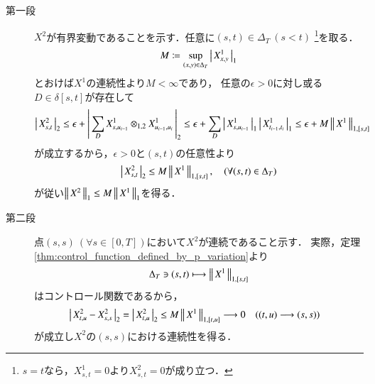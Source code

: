 	\begin{prf}\mbox{}
		\begin{description}
			\item[第一段]
				$X^2$が有界変動であることを示す．任意に$(s,t) \in \Delta_T\ (s < t)$
				\footnote{
					$s=t$なら，$X^1_{s,t} = 0$より$X^2_{s,t} = 0$が成り立つ．
				}を取る．
				\begin{align}
					M \coloneqq \operatorname*{sup}_{(x,y) \in \Delta_T} \left|\, X^1_{x,y}\, \right|_{1}
				\end{align}
				とおけば$X^1$の連続性より$M < \infty$であり，
				任意の$\epsilon > 0$に対し或る$D \in \delta[s,t]$が存在して
				\begin{align}
					\left|\, X^2_{s,t}\, \right|_{2}
					\leq \epsilon + \left|\, \sum_{D} X^1_{s,u_{i-1}} \otimes_{1,2} X^1_{u_{i-1},u_i}\, \right|_{2}
					\leq \epsilon + \sum_D \left|\, X^1_{s,u_{i-1}}\, \right|_{1}
					\left|\, X^1_{t_{i-1},t_i}\, \right|_{1} 
					\leq \epsilon + M \left\|\, X^1\, \right\|_{1,[s,t]}
				\end{align}
				が成立するから，$\epsilon > 0$と$(s,t)$の任意性より
				\begin{align}
					\left|\, X^2_{s,t}\, \right|_{2} \leq M \left\|\, X^1\, \right\|_{1,[s,t]},
					\quad (\forall (s,t) \in \Delta_T)
				\end{align}
				が従い$\left\|\, X^2\, \right\|_{1} \leq M \left\|\, X^1\, \right\|_{1}$を得る．
				
			\item[第二段]
				点$(s,s)\ (\forall s \in [0,T])$において$X^2$が連続であること示す．
				実際，定理\ref{thm:control_function_defined_by_p_variation}より
				\begin{align}
					\Delta_T \ni (s,t) \longmapsto \left\|\, X^1\, \right\|_{1,[s,t]}
				\end{align}
				はコントロール関数であるから，
				\begin{align}
					&\left|\, X^2_{t,u} - X^2_{s,s}\, \right|_{2}
					= \left|\, X^2_{t,u}\, \right|_{2}
					\leq M \left\|\, X^1\, \right\|_{1,[t,u]}
					\longrightarrow 0 \quad ((t,u) \longrightarrow (s,s))
				\end{align}
				が成立し$X^2$の$(s,s)$における連続性を得る．
			

\end{description}
\end{prf}

